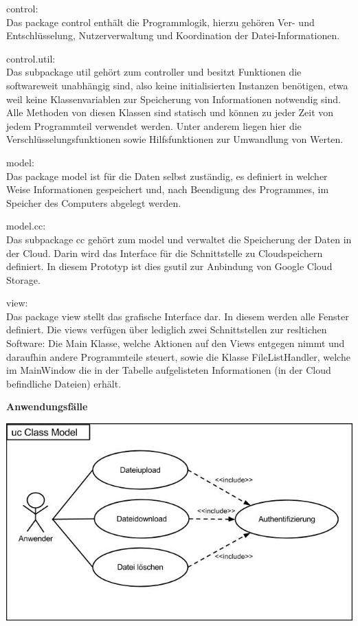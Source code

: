\documentclass[12pt,a4paper,bibliography=totocnumbered,listof=totocnumbered]{scrartcl}
\begin{document}
\begin{compactitem}
	\item control:\\
	Das package control enthält die Programmlogik, hierzu gehören Ver- und Entschlüsselung, Nutzerverwaltung und Koordination der Datei-Informationen.
	\item control.util:\\
	Das subpackage util gehört zum controller und besitzt Funktionen die softwareweit unabhängig sind, also keine initialisierten Instanzen benötigen, etwa weil keine Klassenvariablen zur Speicherung von Informationen notwendig sind. Alle Methoden von diesen Klassen sind statisch und können zu jeder Zeit von jedem Programmteil verwendet werden. Unter anderem liegen hier die Verschlüsselungsfunktionen sowie Hilfsfunktionen zur Umwandlung von Werten. 
	\item model:\\
	Das package model ist für die Daten selbst zuständig, es definiert in welcher Weise Informationen gespeichert und, nach Beendigung des Programmes, im Speicher des Computers abgelegt werden.
	\item model.cc:\\
	Das subpackage cc gehört zum model und verwaltet die Speicherung der Daten in der Cloud. Darin wird das Interface für die Schnittstelle zu Cloudspeichern definiert. In diesem Prototyp ist dies gsutil zur Anbindung von Google Cloud Storage.
	\item view:\\
	Das package view stellt das grafische Interface dar. In diesem werden alle Fenster definiert. Die views verfügen über lediglich zwei Schnittstellen zur resltichen Software: Die Main Klasse, welche Aktionen auf den Views entgegen nimmt und daraufhin andere Programmteile steuert, sowie die Klasse FileListHandler, welche im MainWindow die in der Tabelle aufgelisteten Informationen (in der Cloud befindliche Dateien) erhält.
\end{compactitem}
\pagebreak

\textbf{Anwendungsfälle}
\vspace{1em}
$\;$\\
\begin{minipage}{\linewidth}
	\centering
	\includegraphics[width=0.7\linewidth]{UseCase.jpg}
\end{minipage}
\vspace{1em}
\end{document}
